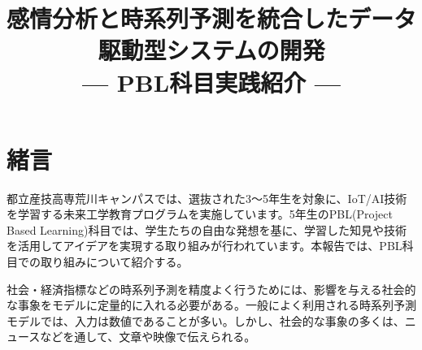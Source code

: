\documentclass[a4paper, 10pt]{article}
\title{{\TitleJFont\bfseries\fontsize{14pt}{14pt} 感情分析と時系列予測を統合したデータ駆動型システムの開発 \\ \normalsize --- PBL科目実践紹介 ---}}
\author{}
\date{}
\begin{document}
\setlength{\columnsep}{7.5mm}


\section{緒言}

都立産技高専荒川キャンパスでは、選抜された3～5年生を対象に、IoT/AI技術を学習する未来工学教育プログラムを実施しています。5年生のPBL(Project Based Learning)科目では、学生たちの自由な発想を基に、学習した知見や技術を活用してアイデアを実現する取り組みが行われています。本報告では、PBL科目での取り組みについて紹介する。


社会・経済指標などの時系列予測を精度よく行うためには、影響を与える社会的な事象をモデルに定量的に入れる必要がある。一般によく利用される時系列予測モデルでは、入力は数値であることが多い。しかし、社会的な事象の多くは、ニュースなどを通して、文章や映像で伝えられる。
\end{document}
